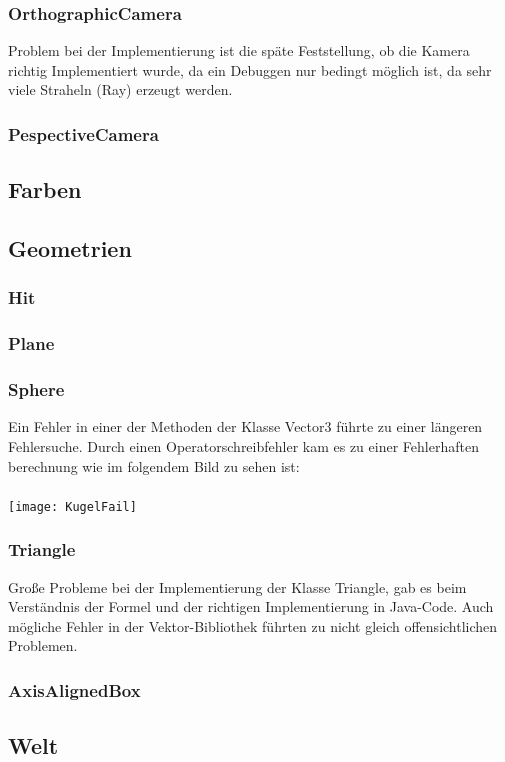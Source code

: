 \documentclass[14pt]{extarticle}
\begin{document}
\subsubsection{OrthographicCamera}
Problem bei der Implementierung ist die späte Feststellung, ob die Kamera richtig Implementiert wurde, da ein Debuggen nur bedingt möglich ist, da sehr viele Straheln (Ray) erzeugt werden.
\subsubsection{PespectiveCamera}
\subsection{Farben}
\subsection{Geometrien}
\subsubsection{Hit}
\subsubsection{Plane}
\subsubsection{Sphere}
Ein Fehler in einer der Methoden der Klasse Vector3 führte zu einer längeren Fehlersuche. Durch einen Operatorschreibfehler kam es zu einer Fehlerhaften berechnung wie im folgendem Bild zu sehen ist:\\\\
\texttt{[image: KugelFail]}
\subsubsection{Triangle}
Große Probleme bei der Implementierung der Klasse Triangle, gab es beim Verständnis der Formel und der richtigen Implementierung in Java-Code. Auch mögliche Fehler in der Vektor-Bibliothek führten zu nicht gleich offensichtlichen Problemen. 
\subsubsection{AxisAlignedBox}

\subsection{Welt}
\end{document}
